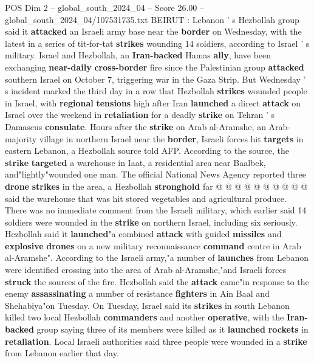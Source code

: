 \begin{textsample}{POS Dim 2 – global\_south\_2024\_04 – Score 26.00 – global\_south\_2024\_04/107531735.txt}  \label{ex:f2_pos_049}
BEIRUT : Lebanon ' s Hezbollah group said it \textbf{attacked} an Israeli army base near the \textbf{border} on Wednesday, with the latest in a series of tit-for-tat \textbf{strikes} wounding 14 soldiers, according to Israel ' s military.
Israel and Hezbollah, an \textbf{Iran-backed} Hamas \textbf{ally}, have been exchanging \textbf{near-daily} \textbf{cross-border} fire since the Palestinian group \textbf{attacked} southern Israel on October 7, triggering war in the Gaza Strip.
But Wednesday ' s incident marked the third day in a row that Hezbollah \textbf{strikes} wounded people in Israel, with \textbf{regional} \textbf{tensions} high after Iran \textbf{launched} a direct \textbf{attack} on Israel over the weekend in \textbf{retaliation} for a deadly \textbf{strike} on Tehran ' s Damascus \textbf{consulate}.
Hours after the \textbf{strike} on Arab al-Aramshe, an Arab-majority village in northern Israel near the \textbf{border}, Israeli forces hit \textbf{targets} in eastern Lebanon, a Hezbollah source told AFP.
According to the source, the \textbf{strike} \textbf{targeted} a warehouse in Iaat, a residential area near Baalbek, and"lightly"wounded one man.
The official National News Agency reported three \textbf{drone} \textbf{strikes} in the area, a Hezbollah \textbf{stronghold} far @ @ @ @ @ @ @ @ @ @ said the warehouse that was hit stored vegetables and agricultural produce.
There was no immediate comment from the Israeli military, which earlier said 14 soldiers were wounded in the \textbf{strike} on northern Israel, including six seriously.
Hezbollah said it \textbf{launched}"a combined \textbf{attack} with guided \textbf{missiles} and \textbf{explosive} \textbf{drones} on a new military reconnaissance \textbf{command} centre in Arab al-Aramshe".
According to the Israeli army,"a number of \textbf{launches} from Lebanon were identified crossing into the area of Arab al-Aramshe,"and Israeli forces \textbf{struck} the sources of the fire.
Hezbollah said the \textbf{attack} came"in response to the enemy \textbf{assassinating} a number of resistance \textbf{fighters} in Ain Baal and Shehabiya"on Tuesday.
On Tuesday, Israel said its \textbf{strikes} in south Lebanon killed two local Hezbollah \textbf{commanders} and another \textbf{operative}, with the \textbf{Iran-backed} group saying three of its members were killed as it \textbf{launched} \textbf{rockets} in \textbf{retaliation}.
Local Israeli authorities said three people were wounded in a \textbf{strike} from Lebanon earlier that day.

\end{textsample}
